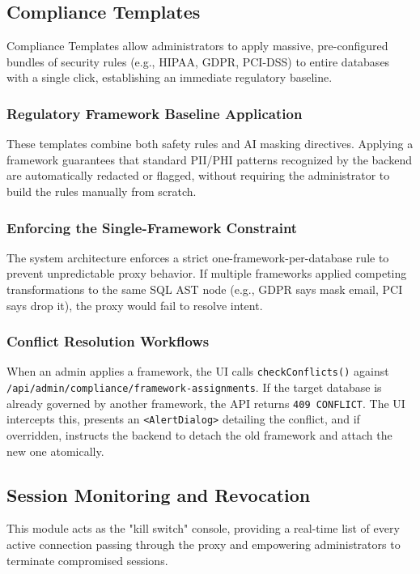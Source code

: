 \subsection{Compliance Templates}
Compliance Templates allow administrators to apply massive, pre-configured bundles of security rules (e.g., HIPAA, GDPR, PCI-DSS) to entire databases with a single click, establishing an immediate regulatory baseline.

\subsubsection{Regulatory Framework Baseline Application}
These templates combine both safety rules and AI masking directives. Applying a framework guarantees that standard PII/PHI patterns recognized by the backend are automatically redacted or flagged, without requiring the administrator to build the rules manually from scratch.

\subsubsection{Enforcing the Single-Framework Constraint}
The system architecture enforces a strict one-framework-per-database rule to prevent unpredictable proxy behavior. If multiple frameworks applied competing transformations to the same SQL AST node (e.g., GDPR says mask email, PCI says drop it), the proxy would fail to resolve intent. 

\subsubsection{Conflict Resolution Workflows}
When an admin applies a framework, the UI calls \texttt{checkConflicts()} against \texttt{/api/\allowbreak admin/\allowbreak compliance/\allowbreak framework-assignments}. If the target database is already governed by another framework, the API returns \texttt{409 CONFLICT}. The UI intercepts this, presents an \texttt{<AlertDialog>} detailing the conflict, and if overridden, instructs the backend to detach the old framework and attach the new one atomically.

\subsection{Session Monitoring and Revocation}
This module acts as the "kill switch" console, providing a real-time list of every active connection passing through the proxy and empowering administrators to terminate compromised sessions.

